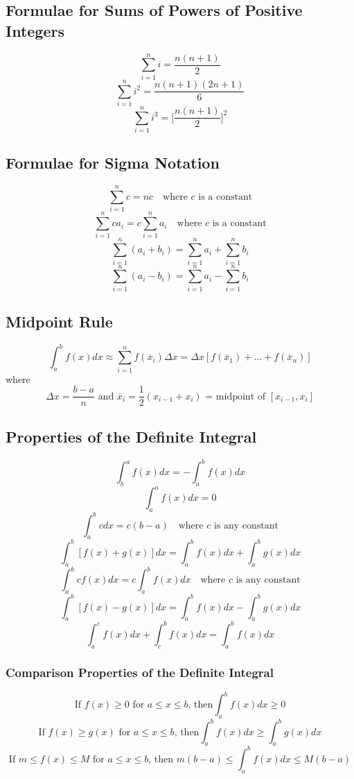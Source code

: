 \subsection*{Formulae for Sums of Powers of Positive Integers}

$$ \sum_{i=1}^n i=\frac{n(n+1)}{2} $$
$$ \sum_{i=1}^n i^2=\frac{n(n+1)(2n+1)}{6} $$
$$ \sum_{i=1}^n i^3= \bigg[ \frac{n(n+1)}{2} \bigg]^2 $$

\subsection*{Formulae for Sigma Notation}

$$ \sum_{i=1}^n c=nc \quad \text{where } c \text{ is a constant} $$
$$ \sum_{i=1}^n ca_i=c \sum_{i=1}^n a_i \quad \text{where } c \text{ is a constant} $$
$$ \sum_{i=1}^n (a_i+b_i)=\sum_{i=1}^n a_i + \sum_{i=1}^n b_i $$
$$ \sum_{i=1}^n (a_i-b_i)=\sum_{i=1}^n a_i - \sum_{i=1}^n b_i $$

\subsection*{Midpoint Rule}

$$ \int_a^b f(x)dx \approx \sum_{i=1}^{n} f(\overline{x}_i) \Delta x = \Delta x [f(\overline{x}_1)+...+f(\overline{x}_n)]$$
where 
$$ \Delta x = \frac{b-a}{n} \text{ and } \overline{x}_i = \frac{1}{2}(x_{i-1} + x_i) \text{ = midpoint of } [x_{i-1},x_i] $$

\subsection*{Properties of the Definite Integral}

$$ \int_b^a f(x)dx = -\int_a^b f(x)dx $$
$$ \int_a^a f(x)dx = 0 $$
$$ \int_a^b c dx = c(b-a) \quad \text{where } c \text{ is any constant} $$
$$ \int_a^b [f(x)+g(x)] dx = \int_a^b f(x)dx + \int_a^b g(x)dx $$
$$ \int_a^b cf(x) dx = c\int_a^b f(x) dx \quad \text{where } c \text{ is any constant} $$
$$ \int_a^b [f(x)-g(x)] dx = \int_a^b f(x)dx - \int_a^b g(x)dx $$
$$ \int_a^c f(x) dx + \int_c^b f(x)dx = \int_a^b f(x)dx $$

\subsubsection*{Comparison Properties of the Definite Integral}

$$ \text{If } f(x) \geq 0 \text{ for } a \leq x \leq b \text{, then} \int_a^b f(x)dx \geq 0 $$
$$ \text{If } f(x) \geq g(x) \text{ for } a \leq x \leq b \text{, then} \int_a^b f(x)dx \geq \int_a^b g(x)dx $$
$$ \text{If } m \leq f(x) \leq M \text{ for } a \leq x \leq b \text{, then } m(b-a) \leq \int_a^b f(x)dx \leq M(b-a) $$
